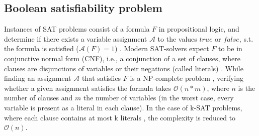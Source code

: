 \subsection{Boolean satisfiability problem}\label{sec:sat}
Instances of SAT problems consist of a formula $F$ in propositional logic, and determine if there exists a variable assignment $\mathcal{A}$ to the values $true$ or $false$, s.t. the formula is satisfied ($\mathcal{A}(F) = 1$) \cite{Biere2009}. Modern SAT-solvers expect $F$ to be in conjunctive normal form (CNF), i.e., a conjunction of a set of clauses, where clauses are disjunctions of variables or their negations (called literals) \cite{cnf_math_encycl}. While finding an assignment $\mathcal{A}$ that satisfies $F$ is a NP-complete problem \cite{Biere2009}, verifying whether a given assignment satisfies the formula takes $\mathcal{O}(n*m)$, where $n$ is the number of clauses and $m$ the number of variables (in the worst case, every variable is present as a literal in each clause). In the case of k-SAT problems, where each clause contains at most k literals \cite{Biere2009}, the complexity is reduced to $\mathcal{O}(n)$.

